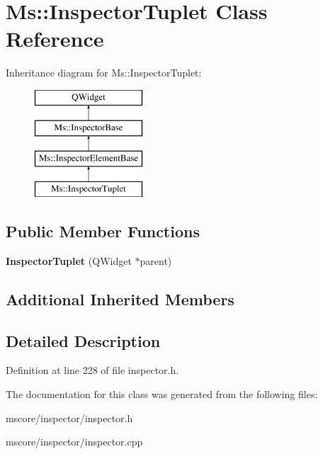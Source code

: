 \hypertarget{class_ms_1_1_inspector_tuplet}{}\section{Ms\+:\+:Inspector\+Tuplet Class Reference}
\label{class_ms_1_1_inspector_tuplet}
Inheritance diagram for Ms\+:\+:Inspector\+Tuplet\+:\begin{figure}[H]
\begin{center}
\leavevmode
\includegraphics[height=4.000000cm]{class_ms_1_1_inspector_tuplet}
\end{center}
\end{figure}
\subsection*{Public Member Functions}
\begin{DoxyCompactItemize}
\item 
\mbox{\label{class_ms_1_1_inspector_tuplet_aa8a15455dc78b58e35a9fe722e4c0c27}} 
{\bfseries Inspector\+Tuplet} (Q\+Widget $\ast$parent)
\end{DoxyCompactItemize}
\subsection*{Additional Inherited Members}


\subsection{Detailed Description}


Definition at line 228 of file inspector.\+h.



The documentation for this class was generated from the following files\+:\begin{DoxyCompactItemize}
\item 
mscore/inspector/inspector.\+h\item 
mscore/inspector/inspector.\+cpp\end{DoxyCompactItemize}
